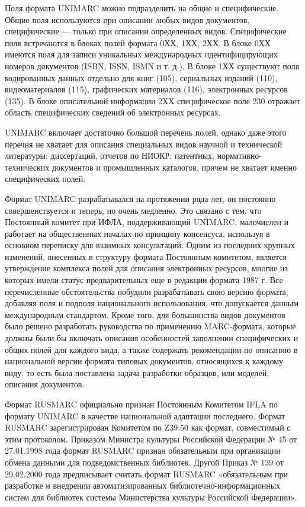Поля формата UNIMARC можно подразделить на общие и специфические. Общие поля используются при описании любых видов документов, специфические — только при описании определенных видов. Специфические поля встречаются в блоках полей формата 0ХХ, 1ХХ, 2ХХ. В блоке 0ХХ имеются поля для записи уникальных международных идентифицирующих номеров документов (ISBN, ISSN, ISMN и т. д.). В блоке 1ХХ существуют поля кодированных данных отдельно для книг (105), сериальных изданий (110), видеоматериалов (115), графических материалов (116), электронных ресурсов (135). В блоке описательной информации 2ХХ специфическое поле 230 отражает область специфических сведений об электронных ресурсах.

UNIMARC включает достаточно большой перечень полей, однако даже этого перечня не хватает для описания специальных видов научной и технической литературы: диссертаций, отчетов по НИОКР, патентных, нормативно-технических документов и промышленных каталогов, причем не хватает именно специфических полей.

Формат UNIMARC разрабатывался на протяжении ряда лет, он постоянно совершенствуется и теперь, но очень медленно. Это связано с тем, что Постоянный комитет при ИФЛА, поддерживающий UNIMARC, малочислен и работает на общественных началах по принципу консенсуса, используя в основном переписку для взаимных консультаций. Одним из последних крупных изменений, внесенных в структуру формата Постоянным комитетом, является утверждение комплекса полей для описания электронных ресурсов, многие из которых имели статус предварительных еще в редакции формата 1987 г. Все перечисленные обстоятельства побудили разрабатывать свою версию формата, добавляя поля и подполя национального использования, что допускается данным международным стандартом. Кроме того, для большинства видов документов было решено разработать руководства по применению MARC-формата, которые должны были бы включать описания особенностей заполнении специфических и общих полей для каждого вида, а также содержать рекомендации по описанию в национальной версии формата типовых документов, относящихся к каждому виду, то есть была поставлена задача разработки образцов, или моделей, описания документов.

Формат RUSMARC официально признан Постоянным Комитетом IFLA по формату UNIMARC в качестве национальной адаптации последнего.
Формат RUSMARC зарегистрирован Комитетом по Z39.50 как формат, совместимый с этим протоколом.
Приказом Министра культуры  Российской Федерации № 45 от 27.01.1998 года формат RUSMARC признан обязательным при организации обмена данными для подведомственных библиотек.
Другой Приказ № 139 от 29.02.2000  года предписывает считать формат RUSMARC «обязательным при разработке и внедрении автоматизированных библиотечно-информационных систем для библиотек системы Министерства культуры Российской Федерации».

